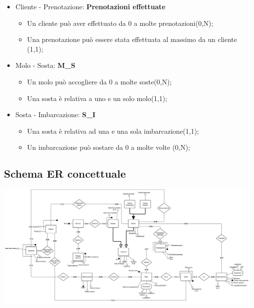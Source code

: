 \begin{itemize}
    \item Cliente - Prenotazione: \textbf{Prenotazioni effettuate}
    \begin{itemize}
        \item Un cliente può aver effettuato da 0 a molte prenotazioni(0,N);
        \item Una prenotazione può essere stata effettuata al massimo da un cliente (1,1);
    \end{itemize}

    \item Molo - Sosta: \textbf{M\_S}
    \begin{itemize}
        \item Un molo può accogliere da 0 a molte soste(0,N);
        \item Una sosta è relativa a uno e un solo molo(1,1);
    \end{itemize}

    \item Sosta - Imbarcazione: \textbf{S\_I}
    \begin{itemize}
        \item Una sosta è relativa ad una e una sola imbarcazione(1,1);
        \item Un imbarcazione può sostare da 0 a molte volte (0,N);
    \end{itemize}
    
\end{itemize}

\subsection{Schema ER concettuale}
\includegraphics[width=\textwidth]{img/erconcettuale.png}